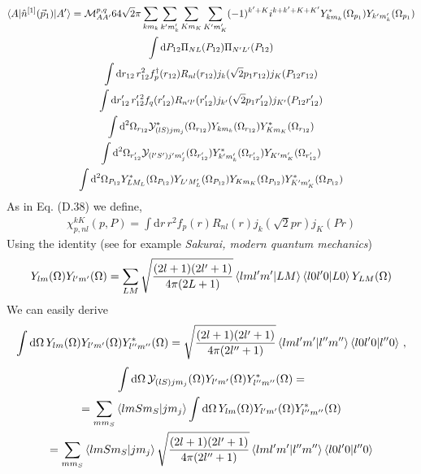 \documentclass[10pt]{article}
\begin{document}
\begin{multline*}
\braket{ A | \hat{n}^{[1]}(\vec{p}_1) | A'} = \mathcal{M}_{A A'}^{p,q} 64 \sqrt{2} \pi \sum_{k m_k} \sum_{k' m_k'} \sum_{K m_K} \sum_{K' m_K'} (-1)^{k'+K} i^{k+k'+K+K'} Y_{k m_k}^{*}(\Omega_{p_1}) Y_{k' m_k'}(\Omega_{p_1}) \\
 \int \text{d} P_{12} \Pi_{N L}(P_{12}) \Pi_{N' L'}(P_{12})\\
 \int \text{d} r_{12}\, r_{12}^{2} f_{p}^{\dagger}(r_{12}) R_{n l}(r_{12}) j_{k}( \sqrt{2} p_1 r_{12})  j_{K}(P_{12} r_{12}) \\
\int \text{d} r_{12}' \, r_{12}^{\prime \, 2} f_{q}(r_{12}')  R_{n' l'}(r_{12}') j_{k'}( \sqrt{2} p_1 r_{12}')  j_{K'}(P_{12} r_{12}') \\
 \int \text{d}^{2} \Omega_{r_{12}}  \mathcal{Y}_{(lS)jm_j}^{*}(\Omega_{r_{12}}) Y_{k m_k}(\Omega_{r_{12}}) Y_{K m_K}^{*}(\Omega_{r_{12}}) \\
 \int \text{d}^{2} \Omega_{r_{12}'}  \mathcal{Y}_{(l'S')j'm_j'}(\Omega_{r_{12}'})  Y_{k' m_k'}^{*}(\Omega_{r_{12}'}) Y_{K' m_K'}(\Omega_{r_{12}'}) \\
   \int \text{d}^{2} \Omega_{P_{12}}  Y_{L M_L}^{*}(\Omega_{P_{12}})  Y_{L' M_L'}(\Omega_{P_{12}}) Y_{K m_K}(\Omega_{P_{12}}) Y_{K' m_K'}^{*}(\Omega_{P_{12}}) \\
\end{multline*}
As in Eq. (D.38) we define,
\begin{align*}
	\chi_{p,nl}^{kK}(p,P) = \int \text{d} r\, r^{2} f_{p}(r) R_{n l}(r) j_{k}( \sqrt{2} p r)  j_{K}(P r)
\end{align*}
Using the identity (see for example \textit{Sakurai, modern quantum mechanics})
\begin{align*}
	Y_{ l m }(\Omega) Y_{ l' m'}(\Omega) = \sum_{LM} \sqrt{ \frac{(2l+1)(2l'+1)}{4 \pi (2L+1)}} \braket{ l m l' m' | L M} \braket{ l 0 l' 0 | L 0 } Y_{L M}(\Omega)
\end{align*}
We can easily derive
\begin{align*}
	\int \text{d} \Omega \, Y_{ l m }(\Omega) Y_{ l' m'}(\Omega) Y_{ l'' m''}^{*}(\Omega) = \sqrt{ \frac{(2l+1)(2l'+1)}{4 \pi (2l''+1)}} \braket{ l m l' m' | l'' m''} \braket{ l 0 l' 0 | l'' 0 } \, ,
\end{align*}
\begin{multline*}
	\int \text{d} \Omega \, \mathcal{Y}_{ (l S) j m_j }(\Omega) Y_{ l' m'}(\Omega) Y_{ l'' m''}^{*}(\Omega) = \\
	= \sum_{m m_S} \braket{ l m S m_S | j m_j} \int \text{d} \Omega \, Y_{ l m }(\Omega) Y_{ l' m'}(\Omega) Y_{ l'' m''}^{*}(\Omega) \\
	= \sum_{m m_S} \braket{ l m S m_S | j m_j} \sqrt{ \frac{(2l+1)(2l'+1)}{4 \pi (2l''+1)}} \braket{ l m l' m' | l'' m''} \braket{ l 0 l' 0 | l'' 0 }
\end{multline*}
\end{document}
